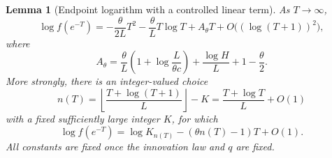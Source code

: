 \documentclass[11pt,a4paper]{article}
\numberwithin{equation}{section}
\newtheorem{lemma}[lemma]{Lemma}
\theoremstyle{definition}\newaliascnt{definition}{theorem}
\theoremstyle{remark}\newaliascnt{remark}{theorem}
\begin{document}
\begin{lemma}[Endpoint logarithm with a controlled linear term]
\label{lem:density-log}
As $T\to\infty$,
\begin{equation}
 \log f(e^{-T})
 =-\frac{\theta}{2L}T^2-\frac{\theta}{L}T\log T+A_\theta T
      +O\bigl((\log(T+1))^2\bigr),
 \label{eq:density-log}
\end{equation}
where
\begin{equation}
 A_\theta=
 \frac{\theta}{L}\left(1+\log\frac{L}{\theta c}\right)
       +\frac{\log H}{L}+1-\frac{\theta}{2}.
 \label{eq:Atheta}
\end{equation}
More strongly, there is an integer-valued choice
\begin{equation}
 n(T)=\left\lfloor\frac{T+\log(T+1)}{L}\right\rfloor-K
       =\frac{T+\log T}{L}+O(1)
 \label{eq:nT}
\end{equation}
with a fixed sufficiently large integer $K$, for which
\begin{equation}
 \log f(e^{-T})=\log K_{n(T)}-(\theta n(T)-1)T+O(1).
 \label{eq:bounded-log-remainder}
\end{equation}
All constants are fixed once the innovation law and $q$ are fixed.
\end{lemma}
\end{document}
